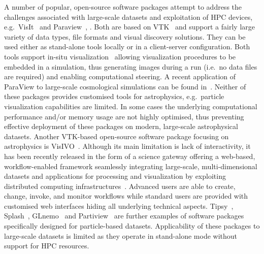 \documentclass[smallextended]{svjour3}
\begin{document}
A number of popular, open-source software packages attempt to address the challenges associated with large-scale datasets and exploitation of HPC devices, e.g.\ VisIt~\cite{visit} and Paraview~\cite{paraview}, \cite{paraviewgrid}. Both are based on VTK~\cite{vtk} and support a fairly large variety of data types, file formats and visual discovery solutions. They can be used either as stand-alone tools locally or in a client-server configuration. Both tools support in-situ visualization~\cite{in-situ} allowing visualization procedures to be embedded in a simulation, thus generating images during a run (i.e.\ no data files are required) and enabling computational steering. A recent application of ParaView to large-scale cosmological simulations can be found in~\cite{2011ApJS..195...11W}. Neither of these packages provides customised tools for astrophysics, e.g.\ particle visualization capabilities are limited. In some cases the underlying computational performance and/or memory usage are not highly optimised, thus preventing effective deployment of these packages on modern, large-scale astrophysical datasets. Another VTK-based open-source software package focusing on astrophysics is VisIVO~\cite{visivo}. Although its main limitation is lack of interactivity, it has been recently released in the form of a science gateway offering a web-based, workflow-enabled framework seamlessly integrating large-scale, multi-dimensional datasets and applications for processing and visualization by exploiting distributed computing infrastructures~\cite{VisIVOGateway}. Advanced users are able to create, change, invoke, and monitor workflows while standard users are provided with customised web interfaces hiding all underlying technical aspects. Tipsy~\cite{tipsyurl}, Splash~\cite{splash}, GLnemo~\cite{glnemo} and Partiview~\cite{partiview} are further examples of software packages specifically designed for particle-based datasets. Applicability of these packages to large-scale datasets is limited as they operate in stand-alone mode without support for HPC resources.
\end{document}
